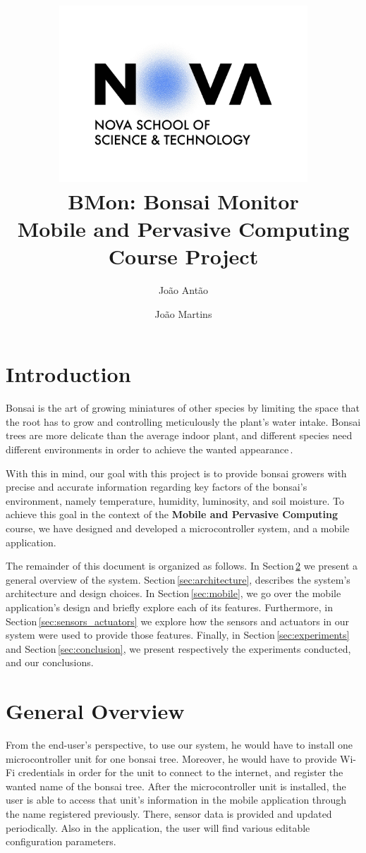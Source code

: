 \documentclass{article}
\title{\textbf{\includegraphics[width=0.7\textwidth]{figures/logo}\\
    \vspace{4 cm}
    BMon: Bonsai Monitor}\\  
    \vspace{2 mm}
    Mobile and Pervasive Computing Course Project}
\author{João Antão \and João Martins}
\begin{document}
\maketitle
\vspace{2 cm}
\newpage
\tableofcontents
\newpage

\section{Introduction}
Bonsai is  the art of growing miniatures of other species by limiting the space
that the root has to grow and controlling meticulously the plant’s water intake.
Bonsai trees are more delicate than the average indoor plant, and different
species need different environments in order to achieve the wanted
appearance\,\cite{bonsai_care}. 

With this in mind, our goal with this project is to provide bonsai growers with
precise and accurate information regarding key factors of the bonsai's
environment, namely temperature, humidity, luminosity, and soil moisture. To
achieve this goal in the context of the \textbf{Mobile and Pervasive Computing}
course, we have designed and developed a microcontroller system, and a mobile
application.

The remainder of this document is organized as follows. In
Section\,\ref{sec:overview} we present a general overview of the system.
Section\,\ref{sec:architecture}, describes the system's  architecture and design
choices. In Section\,\ref{sec:mobile}, we go over the mobile application's
design and briefly explore each of its features. Furthermore, in
Section\,\ref{sec:sensors_actuators} we explore how the sensors and actuators in
our system were used to provide those features. Finally, in
Section\,\ref{sec:experiments} and Section\,\ref{sec:conclusion}, we present
respectively the experiments conducted, and our conclusions.


\section{General Overview}\label{sec:overview}
From the end-user's perspective, to use our system, he would have to install one
microcontroller unit for one bonsai tree. Moreover, he would have to provide
Wi-Fi credentials in order for the unit to connect to the internet, and register
the wanted name of the bonsai tree. After the microcontroller unit is installed,
the user is able to access that unit's information in the mobile application
through the name registered previously. There, sensor data is provided and
updated periodically. Also in the application, the user will find various
editable configuration parameters.
\end{document}
